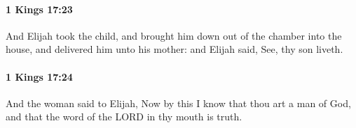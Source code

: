 		\paragraph{1 Kings 17:23} %
			\label{1KINGS-17-23}

			And Elijah took the child, and brought him down out of the chamber into the house, and delivered him unto his mother: and Elijah said, See, thy son liveth.


		\paragraph{1 Kings 17:24} %
			\label{1KINGS-17-24}

			And the woman said to Elijah, Now by this I know that thou art a man of God, and that the word of the LORD in thy mouth is truth.

